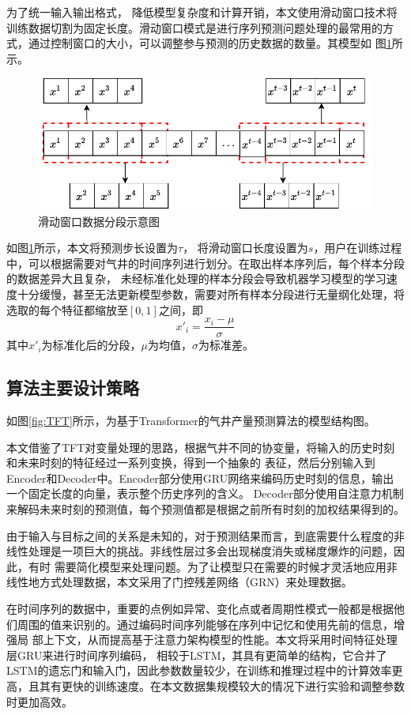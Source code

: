 为了统一输入输出格式，
降低模型复杂度和计算开销，本文使用滑动窗口技术将
训练数据切割为固定长度。滑动窗口模式是进行序列预测问题处理的最常用的方式，通过控制窗口的大小，可以调整参与预测的历史数据的数量。其模型如
图\ref{fig:slidewindow}所示。
\begin{figure}[H]
    \centering
    \includegraphics{figure/滑动窗口.vision.pdf}
    \caption{滑动窗口数据分段示意图}
    \label{fig:slidewindow}
\end{figure}
如图\ref{fig:slidewindow}所示，本文将预测步长设置为$\tau$， 将滑动窗口长度设置为$s$，用户在训练过程中，可以根据需要对气井的时间序列进行划分。在取出样本序列后，每个样本分段的数据差异大且复杂，
未经标准化处理的样本分段会导致机器学习模型的学习速度十分缓慢，甚至无法更新模型参数，需要对所有样本分段进行无量纲化处理，将选取的每个特征都缩放至$[0,1]$之间，即
\begin{equation}
    x'_i = \frac{x_i - \mu}{\sigma}
\end{equation}
其中$x'_i$为标准化后的分段，$\mu$为均值，$\sigma$为标准差。
\subsection{算法主要设计策略}
如图\ref{fig:TFT}所示，为基于Transformer的气井产量预测算法的模型结构图。

本文借鉴了TFT对变量处理的思路，根据气井不同的协变量，将输入的历史时刻和未来时刻的特征经过一系列变换，得到一个抽象的
表征，然后分别输入到Encoder和Decoder中。Encoder部分使用GRU网络来编码历史时刻的信息，输出一个固定长度的向量，表示整个历史序列的含义。
Decoder部分使用自注意力机制来解码未来时刻的预测值，每个预测值都是根据之前所有时刻的加权结果得到的。

由于输入与目标之间的关系是未知的，对于预测结果而言，到底需要什么程度的非线性处理是一项巨大的挑战。非线性层过多会出现梯度消失或梯度爆炸的问题，因此，有时
需要简化模型来处理问题。为了让模型只在需要的时候才灵活地应用非线性地方式处理数据，本文采用了门控残差网络（GRN）来处理数据。

在时间序列的数据中，重要的点例如异常、变化点或者周期性模式一般都是根据他们周围的值来识别的。通过编码时间序列能够在序列中记忆和使用先前的信息，增强局
部上下文，从而提高基于注意力架构模型的性能。本文将采用时间特征处理层GRU来进行时间序列编码，
相较于LSTM，其具有更简单的结构，它合并了LSTM的遗忘门和输入门，因此参数数量较少，在训练和推理过程中的计算效率更高，且其有更快的训练速度。在本文数据集规模较大的情况下进行实验和调整参数时更加高效。

